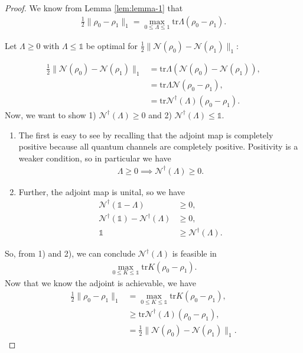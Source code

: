 \documentclass[notoc]{tufte-book}
\begin{document}
\begin{proof}
We know from Lemma \eqref{lem:lemma-1} that 
\begin{align}
    \frac{1}{2} \|\rho_0 - \rho_1\|_1 = \max_{0 \leq \Lambda \leq 1} \text{tr} \Lambda(\rho_0 - \rho_1).
\end{align}

Let $\Lambda \geq 0$ with $\Lambda \leq \mathbb{1}$ be optimal for $\frac{1}{2}\|\mathcal{N}(\rho_0)-\mathcal{N}(\rho_1)\|_1$:

\begin{align}
    \frac{1}{2}\|\mathcal{N}(\rho_0)-\mathcal{N}(\rho_1)\|_1 &=\text{tr}\Lambda(\mathcal{N}(\rho_0)-\mathcal{N}(\rho_1)), \\
    &= \text{tr} \Lambda \mathcal{N}(\rho_0 - \rho_1), \\
    &= \text{tr} \mathcal{N}^{\dagger}(\Lambda)(\rho_0 - \rho_1). 
\end{align}
Now, we want to show 1) $\mathcal{N}^{\dagger}(\Lambda) \geq 0$ and 2) $\mathcal{N}^{\dagger} (\Lambda) \leq \mathbb{1}$. 

\begin{enumerate}
    \item The first is easy to see by recalling that the adjoint map is completely positive because all quantum channels are completely positive. Positivity is a weaker condition, so in particular we have
\begin{align}
    \Lambda \geq 0 \implies \mathcal{N}^{\dagger}(\Lambda) \geq 0.
\end{align}

    \item Further, the adjoint map is unital, so we have 
\begin{align}
    \mathcal{N}^{\dagger}(\mathbb{1}-\Lambda) &\geq 0, \\
    \mathcal{N}^{\dagger}(\mathbb{1}) - \mathcal{N}^{\dagger}(\Lambda) &\geq 0, \\
  \mathbb{1}  &\geq \mathcal{N}^{\dagger}(\Lambda).
\end{align}
\end{enumerate}

So, from 1) and 2), we can conclude $\mathcal{N}^{\dagger}(\Lambda)$ is feasible in 
\begin{align}\max_{0 \leq K \leq \mathbb{1}} \text{tr} K (\rho_0 - \rho_1).
\end{align}
Now that we know the adjoint is achievable, we have 
\begin{align}
    \frac{1}{2} \|\rho_0 - \rho_1\|_1 &= \max_{0 \leq K \leq \mathbb{1}} \text{tr}K(\rho_0 -\rho_1),\\
    &\geq \text{tr} \mathcal{N}^{\dagger}(\Lambda)(\rho_0 - \rho_1),\\
    &= \frac{1}{2} \|\mathcal{N}(\rho_0)-\mathcal{N}(\rho_1)\|_1. 
\end{align}
\end{proof}
\end{document}
